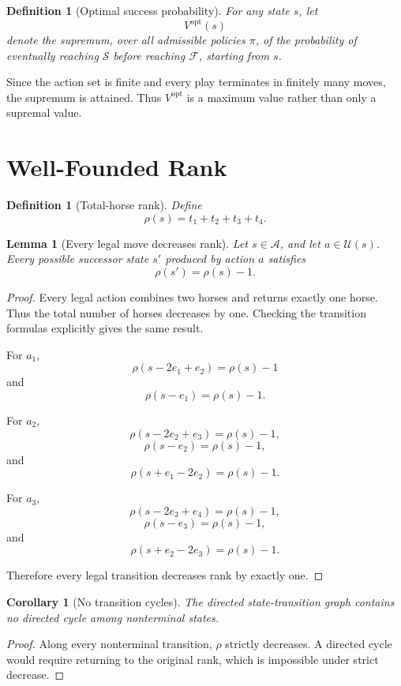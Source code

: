 \documentclass[11pt]{article}
\newtheorem{lemma}[theorem]{Lemma}
\newtheorem{corollary}[theorem]{Corollary}
\newtheorem{definition}[theorem]{Definition}
\newcommand{\Success}{\mathcal{S}}
\newcommand{\Failure}{\mathcal{F}}
\newcommand{\Active}{\mathcal{A}}
\newcommand{\Actions}{\mathcal{U}}
\newcommand{\rank}{\rho}
\newcommand{\opt}{\mathrm{opt}}
\begin{document}
\begin{definition}[Optimal success probability]
For any state \(s\), let
\[
    V^\opt(s)
\]
denote the supremum, over all admissible policies \(\pi\), of the probability of eventually reaching \(\Success\) before reaching \(\Failure\), starting from \(s\).
\end{definition}

Since the action set is finite and every play terminates in finitely many moves, the supremum is attained.  Thus \(V^\opt\) is a maximum value rather than only a supremal value.

\section{Well-Founded Rank}

\begin{definition}[Total-horse rank]
Define
\[
    \rank(s)=t_1+t_2+t_3+t_4.
\]
\end{definition}

\begin{lemma}[Every legal move decreases rank]
Let \(s\in\Active\), and let \(a\in\Actions(s)\).  Every possible successor state \(s'\) produced by action \(a\) satisfies
\[
    \rank(s')=\rank(s)-1.
\]
\end{lemma}

\begin{proof}
Every legal action combines two horses and returns exactly one horse.  Thus the total number of horses decreases by one.  Checking the transition formulas explicitly gives the same result.

For \(a_1\),
\[
    \rank(s-2e_1+e_2)=\rank(s)-1
\]
and
\[
    \rank(s-e_1)=\rank(s)-1.
\]

For \(a_2\),
\[
    \rank(s-2e_2+e_3)=\rank(s)-1,
\]
\[
    \rank(s-e_2)=\rank(s)-1,
\]
and
\[
    \rank(s+e_1-2e_2)=\rank(s)-1.
\]

For \(a_3\),
\[
    \rank(s-2e_3+e_4)=\rank(s)-1,
\]
\[
    \rank(s-e_3)=\rank(s)-1,
\]
and
\[
    \rank(s+e_2-2e_3)=\rank(s)-1.
\]

Therefore every legal transition decreases rank by exactly one.
\end{proof}

\begin{corollary}[No transition cycles]
The directed state-transition graph contains no directed cycle among nonterminal states.
\end{corollary}

\begin{proof}
Along every nonterminal transition, \(\rank\) strictly decreases.  A directed cycle would require returning to the original rank, which is impossible under strict decrease.
\end{proof}
\end{document}
